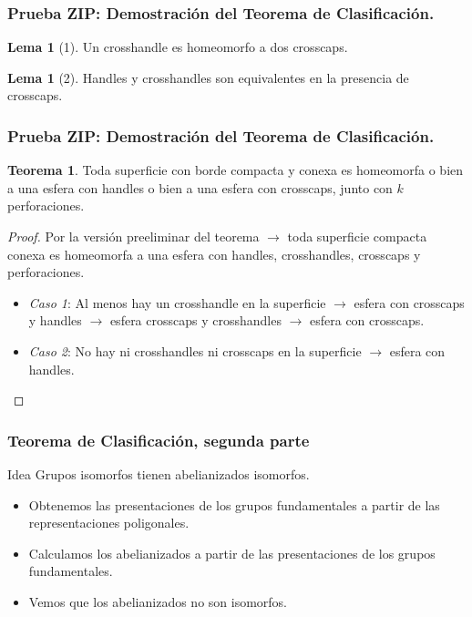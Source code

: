 \documentclass{beamer}
\theoremstyle{definition}
\newtheorem{tma}[defin]{Teorema}
\newtheorem{lema}[defin]{Lema}
\begin{document}
\begin{frame}
\frametitle{Prueba ZIP: Demostración del Teorema de Clasificación.}
\begin{lema} [1]
Un crosshandle es homeomorfo a dos crosscaps.
\end{lema}

\begin{lema}[2]
Handles y crosshandles son equivalentes en la presencia de crosscaps.
\end{lema}
\end{frame}



\begin{frame}
\frametitle{Prueba ZIP: Demostración del Teorema de Clasificación.}
\begin{tma}
Toda superficie con borde compacta y conexa es homeomorfa o bien a una esfera con handles o bien a una esfera con crosscaps, junto con $k$ perforaciones.
\end{tma}
\begin{proof}
Por la versión preeliminar del teorema $\longrightarrow$ toda superficie compacta conexa es homeomorfa a una esfera con handles, crosshandles, crosscaps y perforaciones.

\begin{itemize}
\item \textit{Caso 1}: Al menos hay un crosshandle en la superficie $\rightarrow$ esfera con crosscaps y handles $\rightarrow$ esfera crosscaps y crosshandles $\rightarrow$ esfera con crosscaps.\pause
\item \textit{Caso 2}: No hay ni crosshandles ni crosscaps en la superficie $\rightarrow$ esfera con handles.
\end{itemize}
\end{proof}
\end{frame}

\begin{frame}
\frametitle{Teorema de Clasificación, segunda parte}
\begin{block}{Idea}
Grupos isomorfos tienen abelianizados isomorfos.
\end{block}

\begin{itemize}
\item Obtenemos las presentaciones de los grupos fundamentales a partir de las representaciones poligonales.
\item Calculamos los abelianizados a partir de las presentaciones de los grupos fundamentales.
\item Vemos que los abelianizados no son isomorfos.

\end{itemize}
\end{frame}
\end{document}
